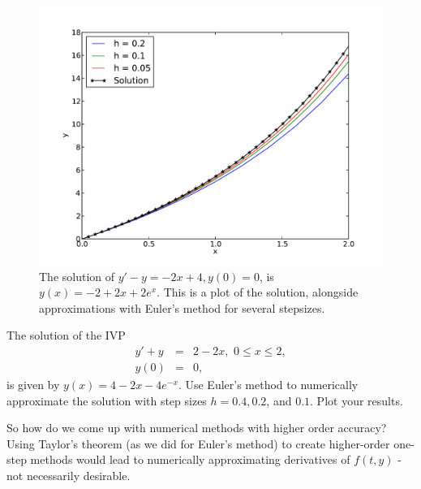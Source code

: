 \begin{figure}[ht]
\centering
\includegraphics[width=\textwidth]{Fig1.pdf}
\caption{The solution of $y' -y= -2x+4, y(0) = 0$, is $y(x) = -2+2x + 2e^x.$ This is a plot of the solution, alongside approximations with Euler's method for several stepsizes.}
\label{ivp:euler}
\end{figure}



\begin{problem}
The solution of the IVP
\begin{eqnarray*}
y' + y &=& 2-2x,\,\, 0 \leq x \leq 2, \\
y(0) &=& 0,
\end{eqnarray*}
is given by $y(x) = 4-2x -4e^{-x}$. 
Use Euler's method to numerically approximate the solution with step sizes $h = 0.4, 0.2$, and $0.1.$ Plot your results.
\end{problem}



So how do we come up with numerical methods with higher order accuracy? Using Taylor's theorem (as we did for Euler's method) to create higher-order one-step methods would lead to numerically approximating derivatives of $f(t,y)$ - not necessarily desirable. 

